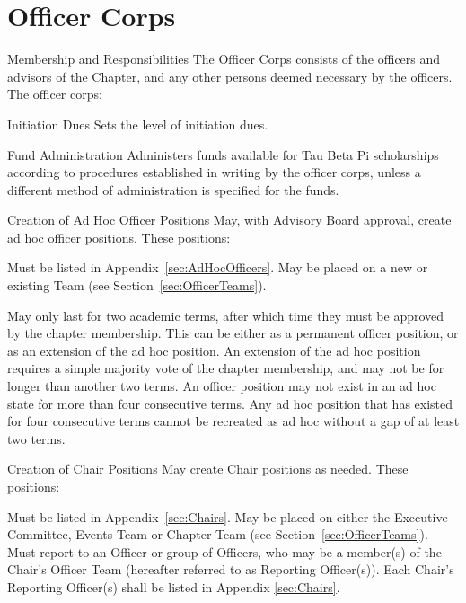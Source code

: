 \section{Officer Corps}\label{sec:officercorps}
\begin{enumsubsection}
\item{Membership and Responsibilities}
The Officer Corps consists of the officers and advisors of the Chapter, and any other persons deemed necessary by the officers.
The officer corps:
\begin{enumsubsubsection}
\item*{Initiation Dues}
Sets the level of initiation dues.
\item*{Fund Administration}
Administers funds available for Tau Beta Pi scholarships according to procedures established in writing by the officer corps, unless a different method of administration is specified for the funds.
\item*{Creation of Ad Hoc Officer Positions}\label{sec:AdHocCreation}
May, with Advisory Board approval, create ad hoc officer positions.
These positions:
\begin{enumerate}
	\itemnotoc Must be listed in Appendix~\ref{sec:AdHocOfficers}.
	\itemnotoc May be placed on a new or existing Team (see Section~\ref{sec:OfficerTeams}).

	\itemnotoc May only last for two academic terms, after which time they must be approved by the chapter membership.
	This can be either as a permanent officer position, or as an extension of the ad hoc position.
	An extension of the ad hoc position requires a simple majority vote of the chapter membership, and may not be for longer than another two terms.
	An officer position may not exist in an ad hoc state for more than four consecutive terms.
	Any ad hoc position that has existed for four consecutive terms cannot be recreated as ad hoc without a gap of at least two terms.

\end{enumerate}
\item*{Creation of Chair Positions}\label{sec:ChairCreation}
May create Chair positions as needed.
These positions:
\begin{enumerate}
	\itemnotoc Must be listed in Appendix~\ref{sec:Chairs}.
	\itemnotoc May be placed on either the Executive Committee, Events Team or Chapter Team (see Section~\ref{sec:OfficerTeams}).
	\itemnotoc Must report to an Officer or group of Officers, who may be a member(s) of the Chair’s Officer Team (hereafter referred to as Reporting Officer(s)).
	Each Chair's Reporting Officer(s) shall be listed in Appendix \ref{sec:Chairs}.


\end{enumerate}
\end{enumsubsubsection}
\end{enumsubsection}

